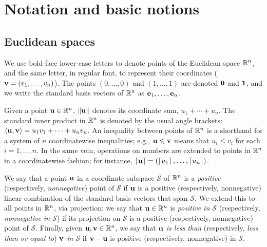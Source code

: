 \documentclass[11pt]{amsart}
\begin{document}




\newpage
\section{Notation and basic notions}


\subsection{Euclidean spaces}
\label{ss: euclidean spaces and convexity}
We use bold-face lower-case letters to denote points of the Euclidean space $\mathbb{R}^n$, and the same letter, in regular font, to represent their coordinates (\eg $\mathbf{v}=(v_1,\ldots,v_n)$).
The points $(0,\ldots,0)$ and $(1,\ldots,1)$ are denoted $\mathbf{0}$ and $\mathbf{1}$, and we write the standard basis vectors of $\mathbb{R}^n$ as $\mathbf{e}_1,\ldots,\mathbf{e}_n$.

Given a point $\mathbf{u}\in \mathbb{R}^n$, $\| \mathbf{u} \|$ denotes its coordinate sum, $u_1+\cdots+u_n$.
The standard inner product in $\mathbb{R}^n$ is denoted by the usual angle brackets: $\langle \mathbf{u}, \mathbf{v} \rangle = u_1v_1 + \cdots + u_nv_n$.
An inequality between points of $\mathbb{R}^n$ is a shorthand for a system of $n$ coordinatewise inequalities; e.g., $\mathbf{u}\leqslant \mathbf{v}$ means that $u_i \le v_i$ for each $i=1,\ldots,n$.
In the same vein, operations on numbers are extended to points in $\mathbb{R}^n$ in a coordinatewise fashion; for instance, $\left\lceil \mathbf{u} \right\rceil=(\left\lceil u_1 \right\rceil,\ldots,\left\lceil u_n \right\rceil)$.

We say that a point $\mathbf{u}$ in a coordinate subspace $\mathcal{S}$ of $\mathbb{R}^n$ is a \emph{positive} (respectively, \emph{nonnegative}) point of $\mathcal{S}$ if $\mathbf{u}$ is a positive (respectively, nonnegative) linear combination of the standard basis vectors that span $\mathcal{S}$.
We extend this to all points in $\mathbb{R}^n$, via projection: we say that $\mathbf{u} \in \mathbb{R}^n$ is \emph{positive in $\mathcal{S}$} (respectively, \emph{nonnegative in $\mathcal{S}$}) if its projection on $\mathcal{S}$ is a positive (respectively, nonnegative) point of $\mathcal{S}$. 
Finally, given $\mathbf{u},\mathbf{v}\in \mathbb{R}^n$, we say that \emph{$\mathbf{u}$ is less than} (respectively, \emph{less than or equal to}) \emph{$\mathbf{v}$ in $\mathcal{S}$} if $\mathbf{v}-\mathbf{u}$ is positive (respectively, nonnegative) in $\mathcal{S}$.
\end{document}
